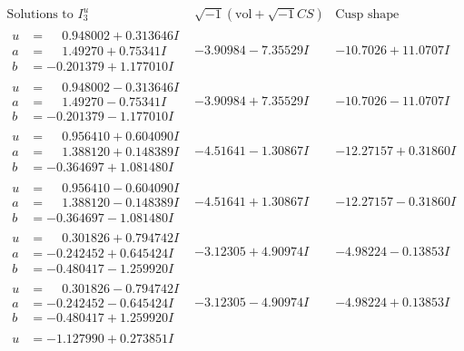 \documentclass[1p]{elsarticle_modified}
\theoremstyle{definition}
\newcommand{\I}{\sqrt{-1}}
\begin{document}
$$\begin{array}{c|c|c}  
\text{Solutions to }I^u_{3}& \I (\text{vol} + \sqrt{-1}CS) & \text{Cusp shape}\\
 \hline 
\begin{aligned}
u &= \phantom{-}0.948002 + 0.313646 I \\
a &= \phantom{-}1.49270 + 0.75341 I \\
b &= -0.201379 + 1.177010 I\end{aligned}
 & -3.90984 - 7.35529 I & -10.7026 + 11.0707 I \\ \hline\begin{aligned}
u &= \phantom{-}0.948002 - 0.313646 I \\
a &= \phantom{-}1.49270 - 0.75341 I \\
b &= -0.201379 - 1.177010 I\end{aligned}
 & -3.90984 + 7.35529 I & -10.7026 - 11.0707 I \\ \hline\begin{aligned}
u &= \phantom{-}0.956410 + 0.604090 I \\
a &= \phantom{-}1.388120 + 0.148389 I \\
b &= -0.364697 + 1.081480 I\end{aligned}
 & -4.51641 - 1.30867 I & -12.27157 + 0.31860 I \\ \hline\begin{aligned}
u &= \phantom{-}0.956410 - 0.604090 I \\
a &= \phantom{-}1.388120 - 0.148389 I \\
b &= -0.364697 - 1.081480 I\end{aligned}
 & -4.51641 + 1.30867 I & -12.27157 - 0.31860 I \\ \hline\begin{aligned}
u &= \phantom{-}0.301826 + 0.794742 I \\
a &= -0.242452 + 0.645424 I \\
b &= -0.480417 - 1.259920 I\end{aligned}
 & -3.12305 + 4.90974 I & -4.98224 - 0.13853 I \\ \hline\begin{aligned}
u &= \phantom{-}0.301826 - 0.794742 I \\
a &= -0.242452 - 0.645424 I \\
b &= -0.480417 + 1.259920 I\end{aligned}
 & -3.12305 - 4.90974 I & -4.98224 + 0.13853 I \\ \hline\begin{aligned}
u &= -1.127990 + 0.273851 I \\

\end{aligned}
\end{array}$$
\end{document}
